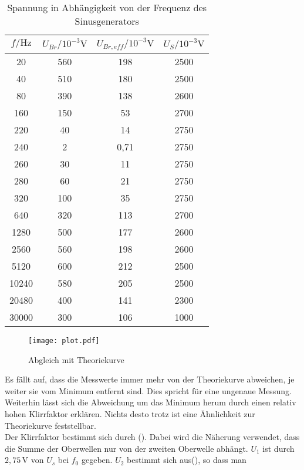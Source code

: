 \begin{table}
  \centering
  \caption{Spannung in Abhängigkeit von der Frequenz des Sinusgenerators}
  \label{tab:Wien-Robinson}
  \begin{tabular}{c c c c}
    \toprule
    $f/\unit{\hertz}$ & $ U_{Br}/10^{-3}\unit{\volt}$ & $U_{Br,eff}/10^{-3}\unit{\volt}$ & $U_{S}/10^{-3}\unit{\volt}$ \\
    \midrule
       20 & 560 & 198   & 2500 \\
       40 & 510 & 180   & 2500 \\
       80 & 390 & 138   & 2600 \\
      160 & 150 &  53   & 2700 \\
      220 &  40 &  14   & 2750 \\
      240 &   2 &  0,71 & 2750 \\
      260 &  30 &  11   & 2750 \\
      280 &  60 &  21   & 2750 \\
      320 & 100 &  35   & 2750 \\
      640 & 320 & 113   & 2700 \\
     1280 & 500 & 177   & 2600 \\
     2560 & 560 & 198   & 2600 \\
     5120 & 600 & 212   & 2500 \\
    10240 & 580 & 205   & 2500 \\
    20480 & 400 & 141   & 2300 \\
    30000 & 300 & 106   & 1000 \\
    \bottomrule
  \end{tabular}
\end{table}

\begin{figure}
  \centering
  \texttt{[image: plot.pdf]}
  \caption{Abgleich mit Theoriekurve}
  \label{fig:plot}
\end{figure}
Es fällt auf, dass die Messwerte immer mehr von der Theoriekurve abweichen, je weiter sie vom Minimum entfernt sind. Dies spricht für eine ungenaue Messung.
Weiterhin lässt sich die Abweichung um das Minimum herum durch einen relativ hohen Klirrfaktor erklären. Nichts desto trotz ist eine Ähnlichkeit zur Theoriekurve
feststellbar.
\\
Der Klirrfaktor bestimmt sich durch (). Dabei wird die Näherung verwendet, dass die Summe der Oberwellen nur von der zweiten Oberwelle abhängt.
$U_1$ ist durch $2,75\,\unit{\volt}$ von $U_s$ bei $f_0$ gegeben. $U_2$ bestimmt sich aus(), so dass man
